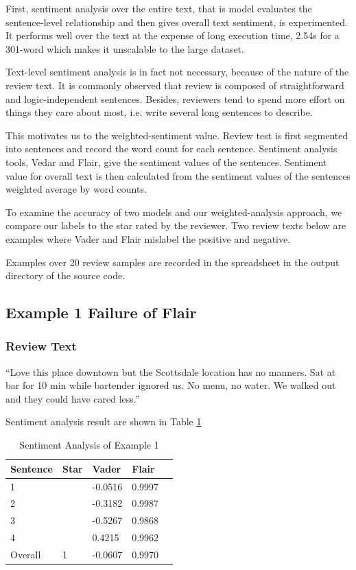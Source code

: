 \documentclass[sigconf]{acmart}
\begin{document}
First, sentiment analysis over the entire text, that is model evaluates the sentence-level relationship and then gives overall text sentiment, is experimented. It performs well over the text at the expense of long execution time, 2.54s for a 301-word which makes it unscalable to the large dataset.

Text-level sentiment analysis is in fact not necessary, because of the nature of the review text. It is commonly observed that review is composed of straightforward and logic-independent sentences. Besides, reviewers tend to spend more effort on things they care about most, i.e. write several long sentences to describe.

This motivates us to the weighted-sentiment value. Review test is first segmented into sentences and record the word count for each sentence. Sentiment analysis tools, Vedar and Flair, give the sentiment values of the sentences. Sentiment value for overall text is then calculated from the sentiment values of the sentences weighted average by word counts.

To examine the accuracy of two models and our weighted-analysis approach, we compare our labels to the star rated by the reviewer. Two review texts below are examples where Vader and Flair mislabel the positive and negative.

Examples over 20 review samples are recorded in the spreadsheet in the output directory of the source code.

\subsection{Example 1 Failure of Flair}
\subsubsection{Review Text}“Love this place downtown but the Scottsdale location has no manners. Sat at bar for 10 min while bartender ignored us. No menu, no water. We walked out and they could have cared less.”

Sentiment analysis result are shown in Table \ref{tab:eg1}
\begin{table}
  \caption{Sentiment Analysis of Example 1}
  \label{tab:eg1}
  \begin{tabular}{lllll}
    \toprule
    Sentence & Star & Vader & Flair \\
    \midrule
    1 & & -0.0516 & 0.9997\\
    2 & & -0.3182 & 0.9987\\
    3 & & -0.5267 & 0.9868\\
    4 & & 0.4215 & 0.9962\\
    \bottomrule
    Overall & 1 & -0.0607 & 0.9970\\
\end{tabular}
\end{table}
\end{document}

